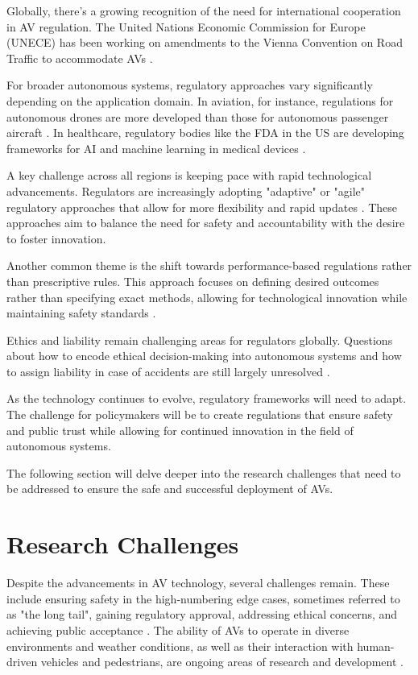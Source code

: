 Globally, there's a growing recognition of the need for international cooperation in AV regulation. The United Nations Economic Commission for Europe (UNECE) has been working on amendments to the Vienna Convention on Road Traffic to accommodate AVs \cite{UNECE2021}.

For broader autonomous systems, regulatory approaches vary significantly depending on the application domain. In aviation, for instance, regulations for autonomous drones are more developed than those for autonomous passenger aircraft \cite{Hodgkinson2018}. In healthcare, regulatory bodies like the FDA in the US are developing frameworks for AI and machine learning in medical devices \cite{FDA2021}.

A key challenge across all regions is keeping pace with rapid technological advancements. Regulators are increasingly adopting "adaptive" or "agile" regulatory approaches that allow for more flexibility and rapid updates \cite{Eggers2019}. These approaches aim to balance the need for safety and accountability with the desire to foster innovation.

Another common theme is the shift towards performance-based regulations rather than prescriptive rules. This approach focuses on defining desired outcomes rather than specifying exact methods, allowing for technological innovation while maintaining safety standards \cite{Cihon2019}.

Ethics and liability remain challenging areas for regulators globally. Questions about how to encode ethical decision-making into autonomous systems and how to assign liability in case of accidents are still largely unresolved \cite{Awad2018}.

As the technology continues to evolve, regulatory frameworks will need to adapt. The challenge for policymakers will be to create regulations that ensure safety and public trust while allowing for continued innovation in the field of autonomous systems.

The following section will delve deeper into the research challenges that need to be addressed to ensure the safe and successful deployment of AVs.

\section{Research Challenges}

Despite the advancements in AV technology, several challenges remain. These include ensuring safety in the high-numbering edge cases, sometimes referred to as "the long tail", gaining regulatory approval, addressing ethical concerns, and achieving public acceptance \cite{Koopman2019}. The ability of AVs to operate in diverse environments and weather conditions, as well as their interaction with human-driven vehicles and pedestrians, are ongoing areas of research and development \cite{Yurtsever2020}.

